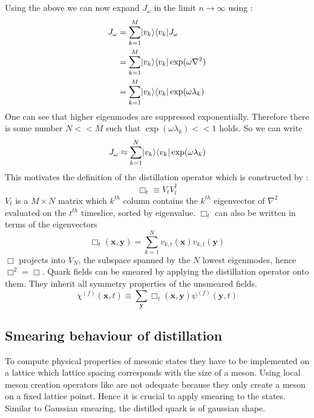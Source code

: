     \noindent
    Using the above we can now expand $J_\omega$ in the limit $n\rightarrow\infty$ using :
    \begin{equation}
        \begin{aligned}
            J_\omega &= \sum^M_{k=1}\lvert v_k\rangle\langle v_k\rvert J_\omega\\
            &= \sum^M_{k=1}\lvert v_k\rangle\langle v_k\rvert \exp(\omega\nabla^2)\\
            &= \sum^M_{k=1}\lvert v_k\rangle\langle v_k\rvert \exp(\omega\lambda_k)
        \end{aligned}
    \end{equation}
    One can see that higher eigenmodes are suppressed exponentially. Therefore there is some number $N<<M$ such that $\exp(\omega\lambda_k) << 1$ holds. So we can write
    \begin{equation}
        J_\omega \approx \sum^N_{k=1}\lvert v_k\rangle\langle v_k\rvert \exp(\omega\lambda_k)
    \end{equation}
    This motivates the definition of the distillation operator which is constructed by \cite{distillation_paper}:
    \begin{equation}
        \Box_t \equiv V_tV_t^\dagger
    \end{equation}
    $V_t$ is a $M \times N$ matrix which $k^{th}$ column contains the $k^{th}$ eigenvector of $\nabla^2$ evaluated on the $t^{th}$ timeslice, sorted by eigenvalue. $\Box_t$ can also be written in terms of the eigenvectors
    \begin{equation}\label{distillation_operator}
        \Box_{t}(\textbf{x},\textbf{y}) = \sum^N_{k=1}v_{k,t}(\textbf{x})v_{k,t}(\textbf{y})
    \end{equation}
    $\Box$ projects into $V_N$, the subspace spanned by the $N$ lowest eigenmodes, hence $\Box^2 = \Box$. Quark fields can be smeared by applying the distillation operator onto them. They inherit all symmetry properties of the unsmeared fields.
    \begin{equation}
        \chi^{(f)}(\textbf{x},t) \equiv \sum_{\textbf{y}} \Box_t(\textbf{x},\textbf{y}) \psi^{(f)}(\textbf{y},t)
    \end{equation}
    
\subsection{Smearing behaviour of distillation}
    To compute physical properties of mesonic states they have to be implemented on a lattice which lattice spacing corresponds with the size of a meson. Using local meson creation operators like  are not adequate because they only create a meson on a fixed lattice poinst. Hence it is crucial to apply smearing to the states. Similar to Gaussian smearing, the distilled quark is of gaussian shape.
    
